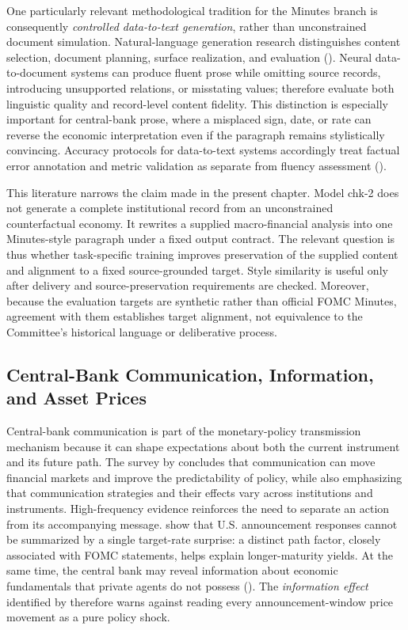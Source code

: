 One particularly relevant methodological tradition for the Minutes branch is
consequently
\emph{controlled data-to-text generation}, rather than unconstrained document
simulation. Natural-language generation research distinguishes content
selection, document planning, surface realization, and evaluation
(\cite{gatt2018survey}). Neural data-to-document systems can produce fluent
prose while omitting source records, introducing unsupported relations, or
misstating values; \citet{wiseman2017challenges} therefore evaluate both
linguistic quality and record-level content fidelity. This distinction is
especially important for central-bank prose, where a misplaced sign, date, or
rate can reverse the economic interpretation even if the paragraph remains
stylistically convincing. Accuracy protocols for data-to-text systems
accordingly treat factual error annotation and metric validation as separate
from fluency assessment (\cite{thomson2020gold}).

This literature narrows the claim made in the present chapter. Model chk-2
does not generate a complete institutional record from an unconstrained
counterfactual economy. It rewrites a supplied macro-financial analysis into
one Minutes-style paragraph under a fixed output contract. The relevant
question is thus whether task-specific training improves preservation of the
supplied content and alignment to a fixed source-grounded target. Style
similarity is useful only after delivery and source-preservation requirements
are checked. Moreover, because the evaluation targets are synthetic rather
than official FOMC Minutes, agreement with them establishes target alignment,
not equivalence to the Committee's historical language or deliberative
process.

\subsection{Central-Bank Communication, Information, and Asset Prices}
\label{ch2:sec:lr:communication}

Central-bank communication is part of the monetary-policy transmission
mechanism because it can shape expectations about both the current instrument
and its future path. The survey by \citet{blinder2008central} concludes that
communication can move financial markets and improve the predictability of
policy, while also emphasizing that communication strategies and their
effects vary across institutions and instruments. High-frequency evidence
reinforces the need to separate an action from its accompanying message.
\citet{gurkaynak2005actions} show that U.S. announcement responses cannot be
summarized by a single target-rate surprise: a distinct path factor, closely
associated with FOMC statements, helps explain longer-maturity yields. At the
same time, the central bank may reveal information about economic fundamentals
that private agents do not possess (\cite{romer2000federal}). The
\emph{information effect} identified by \citet{nakamura2018information}
therefore warns against reading every announcement-window price movement as a
pure policy shock.

